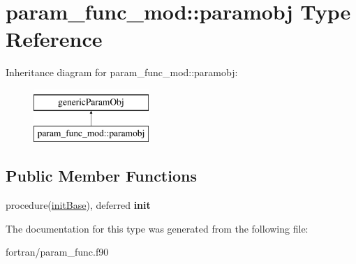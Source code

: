 \hypertarget{structparam__func__mod_1_1paramobj}{}\section{param\+\_\+func\+\_\+mod\+:\+:paramobj Type Reference}
\label{structparam__func__mod_1_1paramobj}
Inheritance diagram for param\+\_\+func\+\_\+mod\+:\+:paramobj\+:\begin{figure}[H]
\begin{center}
\leavevmode
\includegraphics[height=2.000000cm]{structparam__func__mod_1_1paramobj}
\end{center}
\end{figure}
\subsection*{Public Member Functions}
\begin{DoxyCompactItemize}
\item 
\mbox{\label{structparam__func__mod_1_1paramobj_a3e954019411f1e934c8fe5256ca040c3}} 
procedure(\hyperlink{interfaceparam__func__mod_1_1init_base}{init\+Base}), deferred {\bfseries init}
\end{DoxyCompactItemize}


The documentation for this type was generated from the following file\+:\begin{DoxyCompactItemize}
\item 
fortran/param\+\_\+func.\+f90\end{DoxyCompactItemize}

